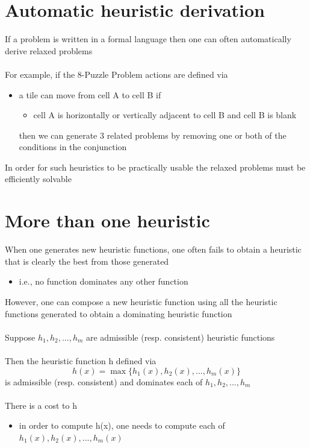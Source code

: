 \documentclass{article}[18pt]
\begin{document}
\section{Automatic heuristic derivation}
If a problem is written in a formal language then one can often automatically derive relaxed problems\\
\\
For example, if the 8-Puzzle Problem actions are defined via
\begin{itemize}
	\item a tile can move from cell A to cell B if
	\begin{itemize}
		\item cell A is horizontally or vertically adjacent to cell B and cell B is blank
	\end{itemize}
	then we can generate 3 related problems by removing one or both of the conditions in the conjunction 
\end{itemize}
In order for such heuristics to be practically usable the relaxed problems must be efficiently solvable
\section{More than one heuristic}
When one generates new heuristic functions, one often fails to obtain a heuristic that is clearly the best from those generated
\begin{itemize}
	\item i.e., no function dominates any other function
\end{itemize}
However, one can compose a new heuristic function using all the heuristic functions generated to obtain a dominating heuristic function\\
\\
Suppose $h_1, h_2,..., h_m$ are admissible (resp. consistent) heuristic functions\\
\\
Then the heuristic function h defined via
$$h(x)=\max\{h_1(x),h_2(x),...,h_m(x)\}$$
is admissible (resp. consistent) and dominates each of $h_1,h_2,...,h_m$\\
\\
There is a cost to h
\begin{itemize}
	\item in order to compute h(x), one needs to compute each of $h_1(x),h_2(x),...,h_m(x)$
\end{itemize}
\end{document}
